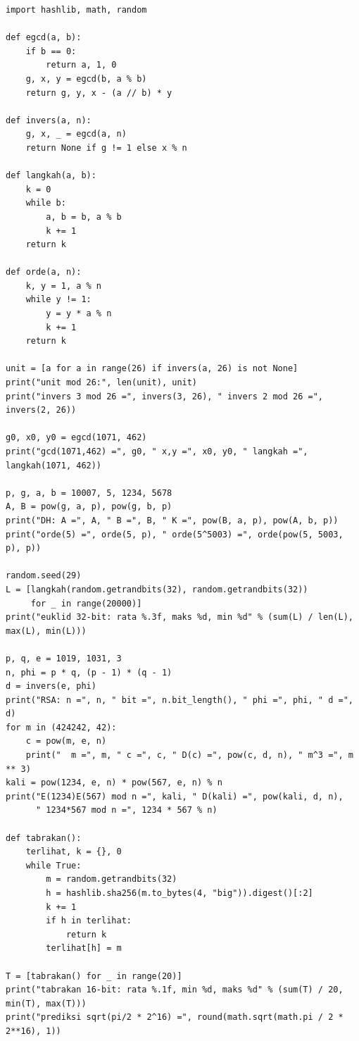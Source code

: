\begin{lab}
\begin{verbatim}
import hashlib, math, random

def egcd(a, b):
    if b == 0:
        return a, 1, 0
    g, x, y = egcd(b, a % b)
    return g, y, x - (a // b) * y

def invers(a, n):
    g, x, _ = egcd(a, n)
    return None if g != 1 else x % n

def langkah(a, b):
    k = 0
    while b:
        a, b = b, a % b
        k += 1
    return k

def orde(a, n):
    k, y = 1, a % n
    while y != 1:
        y = y * a % n
        k += 1
    return k

unit = [a for a in range(26) if invers(a, 26) is not None]
print("unit mod 26:", len(unit), unit)
print("invers 3 mod 26 =", invers(3, 26), " invers 2 mod 26 =", invers(2, 26))

g0, x0, y0 = egcd(1071, 462)
print("gcd(1071,462) =", g0, " x,y =", x0, y0, " langkah =", langkah(1071, 462))

p, g, a, b = 10007, 5, 1234, 5678
A, B = pow(g, a, p), pow(g, b, p)
print("DH: A =", A, " B =", B, " K =", pow(B, a, p), pow(A, b, p))
print("orde(5) =", orde(5, p), " orde(5^5003) =", orde(pow(5, 5003, p), p))

random.seed(29)
L = [langkah(random.getrandbits(32), random.getrandbits(32))
     for _ in range(20000)]
print("euklid 32-bit: rata %.3f, maks %d, min %d" % (sum(L) / len(L), max(L), min(L)))

p, q, e = 1019, 1031, 3
n, phi = p * q, (p - 1) * (q - 1)
d = invers(e, phi)
print("RSA: n =", n, " bit =", n.bit_length(), " phi =", phi, " d =", d)
for m in (424242, 42):
    c = pow(m, e, n)
    print("  m =", m, " c =", c, " D(c) =", pow(c, d, n), " m^3 =", m ** 3)
kali = pow(1234, e, n) * pow(567, e, n) % n
print("E(1234)E(567) mod n =", kali, " D(kali) =", pow(kali, d, n),
      " 1234*567 mod n =", 1234 * 567 % n)

def tabrakan():
    terlihat, k = {}, 0
    while True:
        m = random.getrandbits(32)
        h = hashlib.sha256(m.to_bytes(4, "big")).digest()[:2]
        k += 1
        if h in terlihat:
            return k
        terlihat[h] = m

T = [tabrakan() for _ in range(20)]
print("tabrakan 16-bit: rata %.1f, min %d, maks %d" % (sum(T) / 20, min(T), max(T)))
print("prediksi sqrt(pi/2 * 2^16) =", round(math.sqrt(math.pi / 2 * 2**16), 1))
\end{verbatim}


\end{lab}
